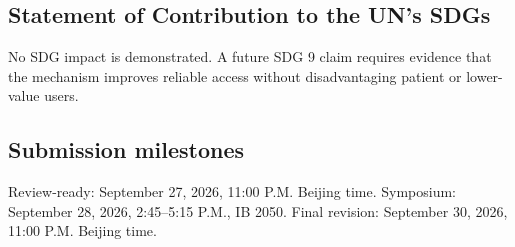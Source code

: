 \subsection*{Statement of Contribution to the UN's SDGs}
No SDG impact is demonstrated. A future SDG 9 claim requires evidence that the mechanism improves reliable access without disadvantaging patient or lower-value users.

\subsection*{Submission milestones}
Review-ready: September 27, 2026, 11:00 P.M. Beijing time. Symposium: September 28, 2026, 2:45--5:15 P.M., IB 2050. Final revision: September 30, 2026, 11:00 P.M. Beijing time.

